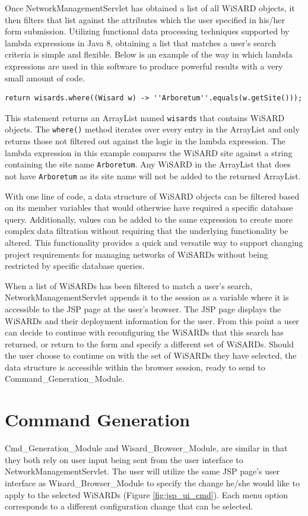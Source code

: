 Once NetworkManagementServlet has obtained a list of all WiSARD objects, it then filters that list against the attributes which the user specified in his/her form submission. Utilizing functional data processing techniques supported by lambda expressions in Java 8, obtaining a list that matches a user's search criteria is simple and flexible. Below is an example of the way in which lambda expressions are used in this software to produce powerful results with a very small amount of code.

\begin{lstlisting}
return wisards.where((Wisard w) -> ''Arboretum''.equals(w.getSite()));
\end{lstlisting}

This statement returns an ArrayList named \verb|wisards| that contains WiSARD objects. The \verb|where()| method iterates over every entry in the ArrayList and only returns those not filtered out against the logic in the lambda expression. The lambda expression in this example compares the WiSARD site against a string containing the site name \verb|Arboretum|. Any WiSARD in the ArrayList that does not have \verb|Arboretum| as its site name will not be added to the returned ArrayList.

With one line of code, a data structure of WiSARD objects can  be filtered based on its member variables that would otherwise have required a specific database query. Additionally, values can be added to the same expression to create more complex data filtration without requiring that the underlying functionality be altered. This functionality provides a quick and versatile way to support changing project requirements for managing networks of WiSARDs without being restricted by specific database queries.

When a list of WiSARDs has been filtered to match a user's search, NetworkManagementServlet appends it to the session as a variable where it is accessible to the JSP page at the user's browser. The JSP page displays the WiSARDs and their deployment information for the user. From this point a user can decide to continue with reconfiguring the WiSARDs that this search has returned, or return to the form and specify a different set of WiSARDs. Should the user choose to continue on with the set of WiSARDs they have selected, the data structure is accessible within the browser session, ready to send to Command\_Generation\_Module.

\section{Command Generation}
Cmd\_Generation\_Module and Wisard\_Browser\_Module, are similar in that they both rely on user input being sent from the user interface to NetworkManagementServlet. The user will utilize the same JSP page's user interface as Wisard\_Browser\_Module to specify the change he/she would like to apply to the selected WiSARDs (Figure \ref{fig:jsp_ui_cmd}). Each menu option corresponds to a different configuration change that can be selected.\\

